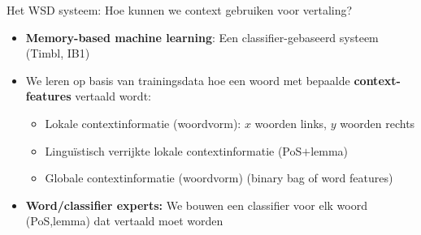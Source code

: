 \documentclass[8pt]{beamer}
\begin{document}
\begin{frame}
    \begin{block}{Het WSD systeem: Hoe kunnen we context gebruiken voor vertaling?}
        \begin{itemize}
            \item \textbf{Memory-based machine learning}: Een classifier-gebaseerd systeem (Timbl, IB1)
            \item We leren op basis van trainingsdata hoe een woord met bepaalde \textbf{context-features} vertaald
                wordt:
            \begin{itemize}
                \item Lokale contextinformatie (woordvorm): $x$ woorden links, $y$ woorden rechts
                \item Linguïstisch verrijkte lokale contextinformatie (PoS$+$lemma)
                \item Globale contextinformatie (woordvorm) \footnotesize{(binary bag of word features)}
            \end{itemize}
            \item \textbf{Word/classifier experts:} We bouwen een classifier voor elk woord (PoS,lemma) dat vertaald
                moet worden
        \end{itemize}
    \end{block}

\end{frame}
\end{document}
